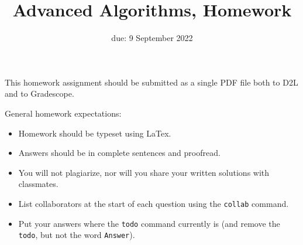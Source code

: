 \documentclass{article}
\title{Advanced Algorithms, Homework \hwnum}
\author{\todo{Your Name Here}}
\date{due: 9 September 2022}
\begin{document}
\maketitle

This homework assignment should be
submitted as a single PDF file both to D2L and to Gradescope.

General homework expectations:
\begin{itemize}
    \item Homework should be typeset using LaTex.
    \item Answers should be in complete sentences and proofread.
    \item You will not plagiarize, nor will you share your written solutions
        with classmates.
    \item List collaborators at the start of each question using the
        \texttt{collab} command.
    \item Put your answers where the \texttt{todo} command currently is (and
        remove the \texttt{todo}, but not the word \texttt{Answer}).
\end{itemize}
\end{document}
